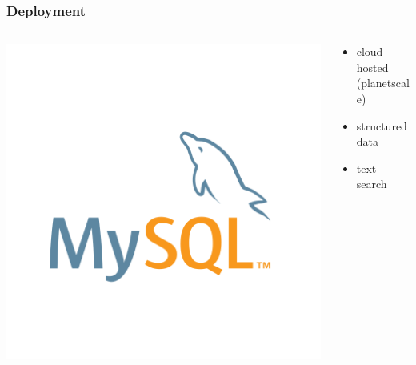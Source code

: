 \documentclass{beamer}
\begin{document}
\begin{frame}
    \frametitle{Deployment}

    \begin{columns}
        \begin{column}{0.4\textwidth}
            \centering
            \includegraphics[width=0.8\linewidth]{mysql.png}
        \end{column}
        \begin{column}{0.6\textwidth}
            \begin{itemize}
                \item cloud hosted (planetscale)
                \item structured data
                \item text search
            \end{itemize}
        \end{column}
    \end{columns}


\end{frame}
\end{document}

